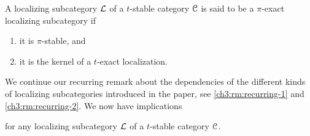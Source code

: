 



\begin{definition}
    \label{ch3:def:pi-exact-localizing-subcategory}
    A localizing subcategory $\mathcal{L}$ of a $t$-stable category $\EuScript{C}$ is said to be a $\pi$-exact localizing subcategory if 
    \begin{enumerate}
        \item it is $\pi$-stable, and
        \item it is the kernel of a $t$-exact localization. 
    \end{enumerate}
\end{definition}

\begin{remark}
    \label{ch3:rm:recurring-3}
    We continue our recurring remark about the dependencies of the different kinds of localizing subcategories introduced in the paper, see \cref{ch3:rm:recurring-1} and \cref{ch3:rm:recurring-2}. We now have implications
    \begin{center}
    \end{center}
    for any localizing subcategory $\mathcal{L}$ of a $t$-stable category $\EuScript{C}$. 
\end{remark}

